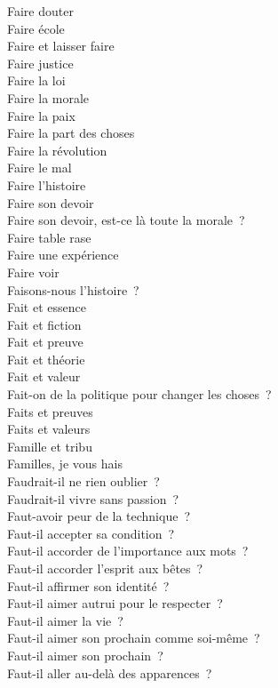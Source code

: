 \documentclass[a4paper,12pt]{article}
\begin{document}
Faire douter \\
Faire école \\
Faire et laisser faire \\
Faire justice \\
Faire la loi \\
Faire la morale \\
Faire la paix \\
Faire la part des choses \\
Faire la révolution \\
Faire le mal \\
Faire l'histoire \\
Faire son devoir \\
Faire son devoir, est-ce là toute la morale ? \\
Faire table rase \\
Faire une expérience \\
Faire voir \\
Faisons-nous l'histoire ? \\
Fait et essence \\
Fait et fiction \\
Fait et preuve \\
Fait et théorie \\
Fait et valeur \\
Fait-on de la politique pour changer les choses ? \\
Faits et preuves \\
Faits et valeurs \\
Famille et tribu \\
Familles, je vous hais \\
Faudrait-il ne rien oublier ? \\
Faudrait-il vivre sans passion ? \\
Faut-avoir peur de la technique ? \\
Faut-il accepter sa condition ? \\
Faut-il accorder de l'importance aux mots ? \\
Faut-il accorder l'esprit aux bêtes ? \\
Faut-il affirmer son identité ? \\
Faut-il aimer autrui pour le respecter ? \\
Faut-il aimer la vie ? \\
Faut-il aimer son prochain comme soi-même ? \\
Faut-il aimer son prochain ? \\
Faut-il aller au-delà des apparences ? \\
\end{document}
